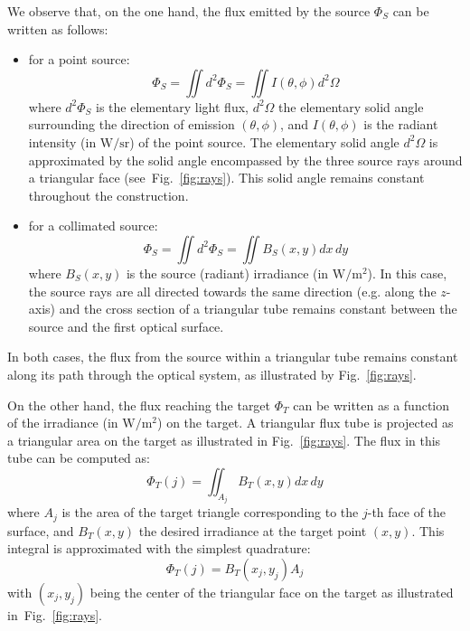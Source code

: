 We observe that, on the one hand, the flux emitted by the source
$\Phi_S$ can be written as follows:
\begin{itemize}
\item for a point source:
  \begin{equation}
   \Phi_S = \iint d^2\Phi_S = \iint I(\theta, \phi) d^2\Omega
   \label{eq:flux_src_point}
  \end{equation}
  where $d^2\Phi_S$ is the elementary light flux, $d^2\Omega$ the
  elementary solid angle surrounding the direction of emission
  $(\theta, \phi)$, and $I(\theta, \phi)$ is the radiant intensity (in
  $\mathrm{W/sr}$) of the point source.  The elementary solid angle
  $d^2\Omega$ is approximated by the solid angle encompassed by the
  three source rays around a triangular face
  (see~Fig.~\ref{fig:rays}).  This solid angle remains constant
  throughout the construction.

\item for a collimated source:
  \begin{equation}
   \Phi_S = \iint d^2\Phi_S = \iint B_S(x, y) dx\,dy 
   \label{eq:flux_src_coll}
  \end{equation}
  where $B_S(x,y)$ is the source (radiant) irradiance (in $\mathrm{W/m^2}$).  In
  this case, the source rays are all directed towards the
  same direction (e.g. along the $z$-axis) and the cross section of a
  triangular tube remains constant between the source and the first
  optical surface.
\end{itemize}
In both cases, the flux from the source within a triangular tube
remains constant along its path through the optical system,
 as illustrated by Fig.~\ref{fig:rays}.

On the other hand, the flux reaching the target $\Phi_T$ can be
written as a function of the irradiance (in $\mathrm{W/m^2}$) on the target.  A
triangular flux tube is projected as a triangular area on the target
as illustrated in Fig.~\ref{fig:rays}.  The flux in this tube can be
computed as:
\[ \Phi_T(j) = \iint_{A_j} B_T(x, y) dx\,dy \]
where $A_j$ is the area of the target triangle corresponding to the
$j$-th face of the surface, and $B_T(x,y)$ the desired irradiance at
the target point $(x,y)$. This integral is approximated with the
simplest quadrature:
\begin{equation}
  \Phi_T(j) = B_T(x_j, y_j) A_j
  \label{eq:flux_target}
\end{equation}  
with $(x_j, y_j)$ being the center of the triangular face on the
target as illustrated in~Fig.~\ref{fig:rays}.


